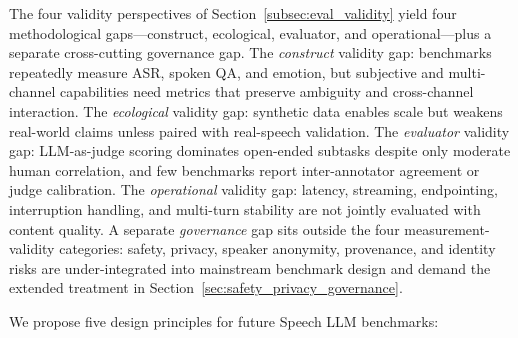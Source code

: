 The four validity perspectives of Section~\ref{subsec:eval_validity}
yield four methodological gaps---construct, ecological, evaluator, and
operational---plus a separate cross-cutting governance gap. The
\emph{construct} validity gap: benchmarks repeatedly measure ASR,
spoken QA, and emotion, but subjective and multi-channel capabilities
need metrics that preserve ambiguity and cross-channel interaction.
The \emph{ecological} validity gap: synthetic data enables scale but
weakens real-world claims unless paired with real-speech validation.
The \emph{evaluator} validity gap: LLM-as-judge scoring dominates
open-ended subtasks despite only moderate human correlation, and few
benchmarks report inter-annotator agreement or judge calibration. The
\emph{operational} validity gap: latency, streaming, endpointing,
interruption handling, and multi-turn stability are not jointly
evaluated with content quality. A separate \emph{governance} gap sits
outside the four measurement-validity categories: safety, privacy,
speaker anonymity, provenance, and identity risks are
under-integrated into mainstream benchmark design and demand the
extended treatment in Section~\ref{sec:safety_privacy_governance}.

We propose five design principles for future Speech LLM benchmarks:

